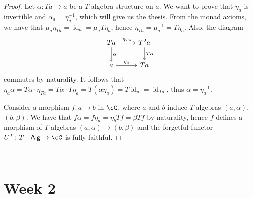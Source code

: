 \documentclass[a4paper,11pt,oneside,openany]{scrbook}
\DeclareMathOperator{\Alg}{-\mathsf{Alg}}
\DeclareMathOperator{\id}{id}
\theoremstyle{definition}
\theoremstyle{definition}
\begin{document}
\begin{proof}
    Let $\alpha\colon Ta\rightarrow a$ be a $T$-algebra structure on $a$. We
    want to prove that $\eta_a$ is invertible and $\alpha_a=\eta_a^{-1}$, which
    will give us the thesis. From the monad axioms, we have that
    $\mu_a\eta_{Ta}=\id_a=\mu_a T\eta_a$, hence $\eta_{Ta}=\mu_a^{-1}=T\eta_a$.
    Also, the diagram
    \[
    \begin{tikzcd}
        Ta\ar[r, "\eta_{Ta}"]\ar[d, "\alpha"]
        & T^2a\ar[d, "T\alpha"] \\
        a\ar[r, "\eta_a"]
        & Ta
    \end{tikzcd}
    \]
    commutes by naturality. It follows that
    $\eta_a\alpha=T\alpha\cdot\eta_{Ta}=T\alpha\cdot
    T\eta_a=T(\alpha\eta_a)=T\id_a=\id_{Ta}$, thus $\alpha=\eta_a^{-1}$.

    Consider a morphism $f\colon a\rightarrow b$ in $\cC$, where $a$ and $b$
    induce $T$-algebras $(a,\alpha)$, $(b,\beta)$. We have that
    $f\alpha=f\eta_a=\eta_b Tf=\beta Tf$ by naturality, hence $f$ defines a
    morphism of $T$-algebras $(a,\alpha)\rightarrow(b,\beta)$ and the forgetful
    functor $U^T\colon T\Alg\rightarrow\cC$ is fully faithful.
\end{proof}


~\\
\chapter{Week 2}
\end{document}
